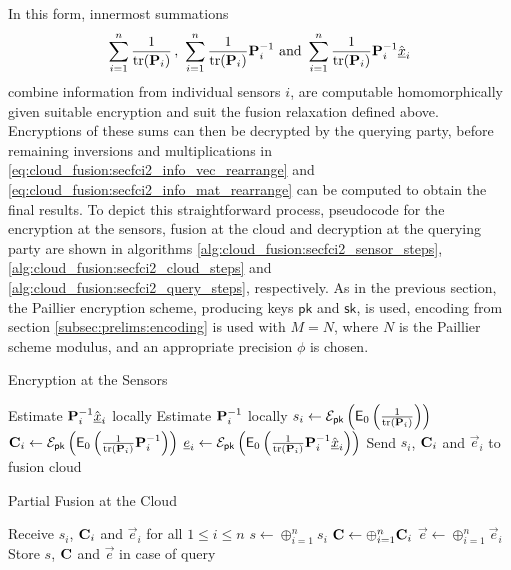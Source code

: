 In this form, innermost summations  
\begin{equation}
    \sum_{i=1}^n \frac{1}{\tr(\mat{P}_i)}\,,\ \sum_{i=1}^n \frac{1}{\tr(\mat{P}_i)}\mat{P}_i^{-1}\text{ and }\sum_{i=1}^n\frac{1}{\tr(\mat{P}_i)}\mat{P}_i^{-1}\hat{\vec{x}}_i
\end{equation}
combine information from individual sensors $i$, are computable homomorphically given suitable encryption and suit the fusion relaxation defined above. Encryptions of these sums can then be decrypted by the querying party, before remaining inversions and multiplications in \eqref{eq:cloud_fusion:secfci2_info_vec_rearrange} and \eqref{eq:cloud_fusion:secfci2_info_mat_rearrange} can be computed to obtain the final results. To depict this straightforward process, pseudocode for the encryption at the sensors, fusion at the cloud and decryption at the querying party are shown in algorithms \ref{alg:cloud_fusion:secfci2_sensor_steps}, \ref{alg:cloud_fusion:secfci2_cloud_steps} and \ref{alg:cloud_fusion:secfci2_query_steps}, respectively. As in the previous section, the Paillier encryption scheme, producing keys $\mathsf{pk}$ and $\mathsf{sk}$, is used, encoding from section \ref{subsec:prelims:encoding} is used with $M=N$, where $N$ is the Paillier scheme modulus, and an appropriate precision $\phi$ is chosen.
\begin{algorithm}[htbp]
\caption{Encryption at the Sensors}\label{alg:cloud_fusion:secfci2_sensor_steps}
\begin{algorithmic}[1]
    \State Estimate ${{\mathbf{P}}}_i^{-1}\hat{{\underline{x}}}_i$ locally
    \State Estimate ${{\mathbf{P}}}_i^{-1}$ locally
    \State $s_i \gets \mathcal{E}_{\mathsf{pk}}\left(\mathsf{E}_{0}\left(\frac{1}{\operatorname{tr}({{\mathbf{P}}}_i)}\right)\right)$
    \State ${{\mathbf{C}}}_i \gets \mathcal{E}_{\mathsf{pk}}\left(\mathsf{E}_{0}\left(\frac{1}{\operatorname{tr}({{\mathbf{P}}}_i)}{{\mathbf{P}}}_i^{-1}\right)\right)$
    \State ${\underline{e}}_i \gets \mathcal{E}_{\mathsf{pk}}\left(\mathsf{E}_{0}\left(\frac{1}{\operatorname{tr}({{\mathbf{P}}}_i)}{{\mathbf{P}}}_i^{-1}\hat{{\underline{x}}}_i\right)\right)$
    \State Send $s_i$, ${{\mathbf{C}}}_i$ and $\vec{e}_i$ to fusion cloud
    \EndProcedure
\end{algorithmic}
\end{algorithm}
\begin{algorithm}[htbp]
\caption{Partial Fusion at the Cloud}\label{alg:cloud_fusion:secfci2_cloud_steps}
\begin{algorithmic}[1]
    \State Receive $s_i$, ${{\mathbf{C}}}_i$ and $\vec{e}_i$ for all $1\leq i \leq n$
    \State $s \gets \oplus_{i=1}^{n} s_i$
    \State ${{\mathbf{C}}} \gets \oplus_{i=1}^{n} {{\mathbf{C}}}_i$
    \State $\vec{e} \gets \oplus_{i=1}^{n} \vec{e}_i$
    \State Store $s$, ${{\mathbf{C}}}$ and $\vec{e}$ in case of query
    \EndProcedure
\end{algorithmic}
\end{algorithm}
